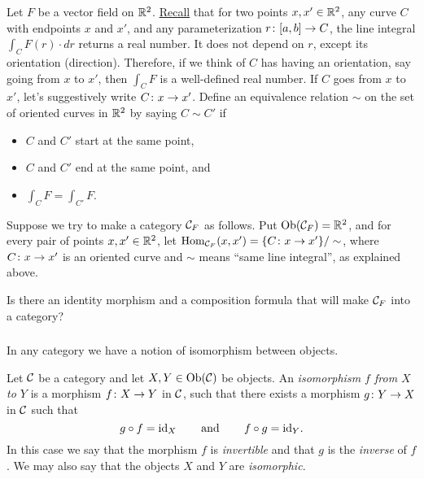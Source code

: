 \documentclass[CT4S-EN-RU]{subfiles}
\begin{document}
\begin{exercise}\label{exc:vector field 1}
Let $F$ be a vector field on ${\mathbb R}^2$. \href{http://en.wikipedia.org/wiki/Line_integral#Line_integral_of_a_vector_field}{Recall} that for two points $x,x'\in{\mathbb R}^2$, any curve $C$ with endpoints $x$ and $x'$, and any parameterization $r\colon [a,b]\rightarrow C$, the line integral $\int_CF(r)\cdot dr$ returns a real number. It does not depend on $r$, except its orientation (direction). Therefore, if we think of $C$ has having an orientation, say going from $x$ to $x'$, then $\int_CF$ is a well-defined real number. If $C$ goes from $x$ to $x'$, let's suggestively write $C\colon x\rightarrow x'$. Define an equivalence relation $\sim$ on the set of oriented curves in ${\mathbb R}^2$ by saying $C\sim C'$ if
\begin{itemize}
\item $C$ and $C'$ start at the same point,
\item $C$ and $C'$ end at the same point, and
\item $\int_CF=\int_{C'}F$.
\end{itemize}

Suppose we try to make a category $\mathcal{C}_F$ as follows. Put $\textnormal{Ob}(\mathcal{C}_F)={\mathbb R}^2$, and for every pair of points $x,x'\in{\mathbb R}^2$, let $\textnormal{Hom}_{\mathcal{C}_F}(x,x')=\{C\colon x\rightarrow x'\}/\sim$, where $C\colon x\rightarrow x'$ is an oriented curve and $\sim$ means “same line integral”, as explained above. 

Is there an identity morphism and a composition formula that will make $\mathcal{C}_F$ into a category? 
\end{exercise}


\subsubsection{}

In any category we have a notion of isomorphism between objects.

\begin{definition}

Let $\mathcal{C}$ be a category and let $X,Y\in\textnormal{Ob}(\mathcal{C})$ be objects. An {\em isomorphism $f$ from $X$ to $Y$} is a morphism $f\colon X\rightarrow Y$ in $\mathcal{C}$, such that there exists a morphism $g\colon Y\rightarrow X$ in $\mathcal{C}$ such that $$g\circ f=\textnormal{id}_X\hspace{.3in}\textnormal{and}\hspace{.3in} f\circ g=\textnormal{id}_Y.$$ In this case we say that the morphism $f$ is {\em invertible} and that $g$ is the {\em inverse} of $f$. We may also say that the objects $X$ and $Y$ are {\em isomorphic}.

\end{definition}
\end{document}
